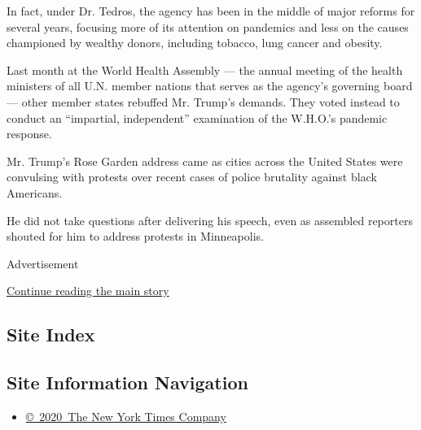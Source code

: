 In fact, under Dr. Tedros, the agency has been in the middle of major
reforms for several years, focusing more of its attention on pandemics
and less on the causes championed by wealthy donors, including tobacco,
lung cancer and obesity.

Last month at the World Health Assembly --- the annual meeting of the
health ministers of all U.N. member nations that serves as the agency's
governing board --- other member states rebuffed Mr. Trump's demands.
They voted instead to conduct an ``impartial, independent'' examination
of the W.H.O.'s pandemic response.

Mr. Trump's Rose Garden address came as cities across the United States
were convulsing with protests over recent cases of police brutality
against black Americans.

He did not take questions after delivering his speech, even as assembled
reporters shouted for him to address protests in Minneapolis.

Advertisement

\protect\hyperlink{after-bottom}{Continue reading the main story}

\hypertarget{site-index}{%
\subsection{Site Index}\label{site-index}}

\hypertarget{site-information-navigation}{%
\subsection{Site Information
Navigation}\label{site-information-navigation}}

\begin{itemize}
\tightlist
\item
  \href{https://help.nytimes3xbfgragh.onion/hc/en-us/articles/115014792127-Copyright-notice}{©~2020~The
  New York Times Company}
\end{itemize}

